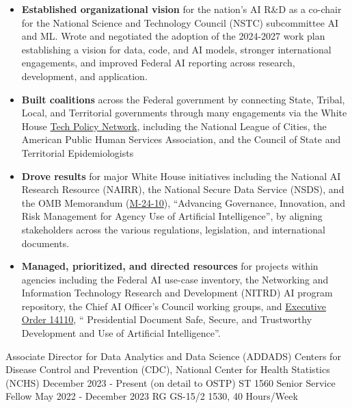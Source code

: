 \documentclass[]{scrartcl}
\begin{document}
\begin{cleanCV}
{\begin{itemize}
  \item \textbf{Established organizational vision} for the nation's AI R\&D as a co-chair for the National Science and Technology Council (NSTC) subcommittee AI and ML. Wrote and negotiated the adoption of the 2024-2027 work plan establishing a vision for data, code, and AI models, stronger international engagements, and improved Federal AI reporting across research, development, and application.
  \item \textbf{Built coalitions} across the Federal government by connecting State, Tribal, Local, and Territorial governments through many engagements via the White House \href{https://www.whitehouse.gov/ostp/news-updates/2023/11/13/readout-of-roundtable-with-state-local-tribal-and-territorial-leaders-on-tech-policy/}{Tech Policy Network}, including the National League of Cities, the American Public Human Services Association, and the Council of State and Territorial Epidemiologists
  \item \textbf{Drove results} for major White House initiatives including the National AI Research Resource (NAIRR), the National Secure Data Service (NSDS), and the OMB Memorandum (\href{https://www.whitehouse.gov/wp-content/uploads/2024/03/M-24-10-Advancing-Governance-Innovation-and-Risk-Management-for-Agency-Use-of-Artificial-Intelligence.pdf}{M-24-10}), ``Advancing Governance, Innovation, and Risk Management for Agency Use of Artificial Intelligence'', by aligning stakeholders across the various regulations, legislation, and international documents.
  \item \textbf{Managed, prioritized, and directed resources} for projects within agencies including the Federal AI use-case inventory, the Networking and Information Technology Research and Development (NITRD) AI program repository, the Chief AI Officer's Council working groups, and \href{https://www.federalregister.gov/documents/2023/11/01/2023-24283/safe-secure-and-trustworthy-development-and-use-of-artificial-intelligence}{Executive Order 14110}, `` Presidential Document Safe, Secure, and Trustworthy Development and Use of Artificial Intelligence''.

  \end{itemize}
}

\WorkExperience
{}
{Associate Director for Data Analytics and Data Science (ADDADS)}
{
  \newline Centers for Disease Control and Prevention (CDC), National Center for Health Statistics (NCHS)
  \newline December 2023 - Present (on detail to OSTP)
  \newline ST 1560
  \newline
  \newline Senior Service Fellow
  \newline May 2022 - December 2023
  \newline RG GS-15/2 1530, 40 Hours/Week
}
{
  \vspace{-0.25em}
  \begin{itemize}


\end{itemize}}
\end{cleanCV}
\end{document}
